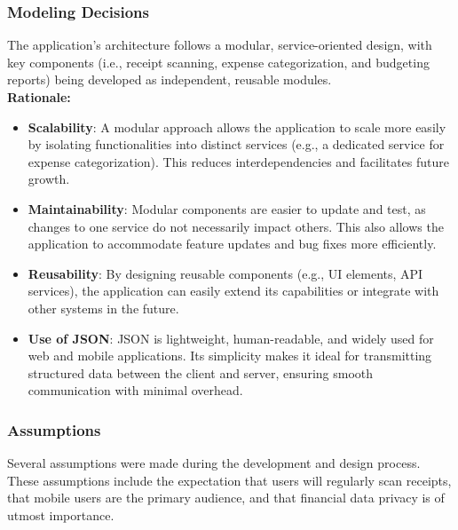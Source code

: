 \documentclass[12pt]{article}
\begin{document}
\subsubsection{Modeling Decisions}
The application's architecture follows a modular, service-oriented design, with key components (i.e., receipt scanning, expense categorization, and budgeting reports) being developed as independent, reusable modules.\\

\noindent\textbf{Rationale:}
\begin{itemize}
    \item \textbf{Scalability}: A modular approach allows the application to scale more easily by isolating functionalities into distinct services (e.g., a dedicated service for expense categorization). This reduces interdependencies and facilitates future growth.
    \item \textbf{Maintainability}: Modular components are easier to update and test, as changes to one service do not necessarily impact others. This also allows the application to accommodate feature updates and bug fixes more efficiently.
    \item \textbf{Reusability}: By designing reusable components (e.g., UI elements, API services), the application can easily extend its capabilities or integrate with other systems in the future.
    \item \textbf{Use of JSON}: JSON is lightweight, human-readable, and widely used for web and mobile applications. Its simplicity makes it ideal for transmitting structured data between the client and server, ensuring smooth communication with minimal overhead.
\end{itemize}

\subsubsection{Assumptions}
Several assumptions were made during the development and design process. These assumptions include the expectation that users will regularly scan receipts, that mobile users are the primary audience, and that financial data privacy is of utmost importance.\\
\end{document}
